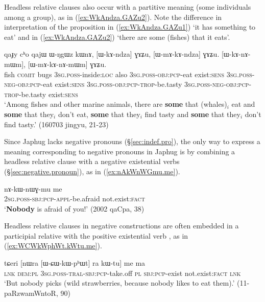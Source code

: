 Headless relative clauses also occur with a partitive meaning (some individuals among a group), as in (\ref{ex:WkAndza.GAZu2}). Note the difference in interpretation of the proposition  in (\ref{ex:WkAndza.GAZu1}) `it has something to eat' and in (\ref{ex:WkAndza.GAZu2}) `there are some (fishes) that it eats'.

\begin{exe}
\ex \label{ex:WkAndza.GAZu2}
\gll qaɟy cʰo qajɯ ɯ-ŋgɯz kɯnɤ, [ɯ-kɤ-ndza] ɣɤʑu, [ɯ-mɤ-kɤ-ndza] ɣɤʑu. [ɯ-kɤ-nɤ-mɯm], [ɯ-mɤ-kɤ-nɤ-mɯm] ɣɤʑu. \\
fish \textsc{comit} bugs \textsc{3sg}.\textsc{poss}-inside:\textsc{loc} also \textsc{3sg}.\textsc{poss}-\textsc{obj}:\textsc{pcp}-eat exist:\textsc{sens}  \textsc{3sg}.\textsc{poss}-\textsc{neg}-\textsc{obj}:\textsc{pcp}-eat exist:\textsc{sens} \textsc{3sg}.\textsc{poss}-\textsc{obj}:\textsc{pcp}-\textsc{trop}-be.tasty \textsc{3sg}.\textsc{poss}-\textsc{neg}-\textsc{obj}:\textsc{pcp}-\textsc{trop}-be.tasty exist:\textsc{sens}  \\
\glt `Among fishes and other marine animals, there are \textbf{some} that (whales)$_i$ eat and \textbf{some} that they$_i$ don't eat, \textbf{some} that they$_i$ find tasty and \textbf{some} that they$_i$ don't find tasty.' (160703 jingyu, 21-23)
\end{exe}

Since Japhug lacks negative pronouns (§\ref{sec:indef.pro}), the only way to express a meaning corresponding to negative pronouns in Japhug is by combining a headless relative clause with a negative existential verbs (§\ref{sec:negative.pronoun}), as in (\ref{ex:nAkWnWGmu.me}).

\begin{exe}
\ex \label{ex:nAkWnWGmu.me}
\gll nɤ-kɯ-nɯɣ-mu me \\
\textsc{2sg}.\textsc{poss}-\textsc{sbj}:\textsc{pcp}-\textsc{appl}-be.afraid not.exist:\textsc{fact} \\
\glt `\textbf{Nobody} is afraid of you!' (2002 qaCpa, 38)
\end{exe}


Headless relative clauses in negative constructions are often embedded in a participial relative with the positive existential verb , as in (\ref{ex:WCWkWphWt.kWtu.me}).

\begin{exe}
\ex \label{ex:WCWkWphWt.kWtu.me}
\gll tɕeri [nɯra [ɯ-ɕɯ-kɯ-pʰɯt] ra kɯ-tu] me ma \\
\textsc{lnk} \textsc{dem}:\textsc{pl} \textsc{3sg}.\textsc{poss}-\textsc{tral}-\textsc{sbj}:\textsc{pcp}-take.off \textsc{pl} \textsc{sbj}:\textsc{pcp}-exist not.exist:\textsc{fact} \textsc{lnk} \\
\glt `But nobody picks (wild strawberries, because nobody likes to eat them).' (11-paRzwamWntoR, 90)
\end{exe}

